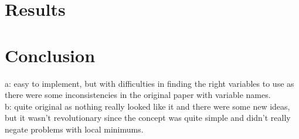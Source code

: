 \documentclass[runningheads]{llncs}
\begin{document}
\section{Results}




\section{Conclusion}
a:
easy to implement, but with difficulties in finding the right variables to use as there were some inconsistencies in the original paper with variable names. \\
b:
quite original as nothing really looked like it and there were some new ideas, but it wasn't revolutionary since the concept was quite simple and didn't really negate problems with local minimums.\\






\end{document}
